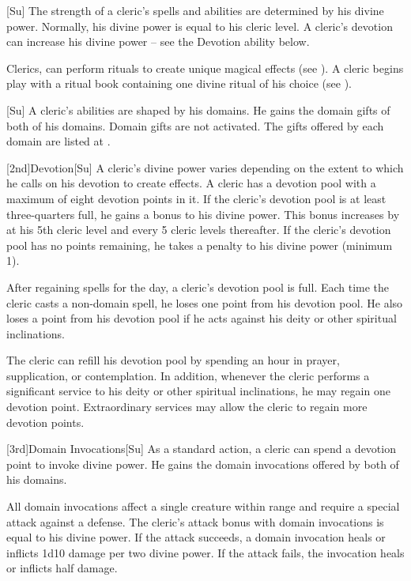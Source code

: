 [Su]
The strength of a cleric's spells and abilities are determined by his divine power.
Normally, his divine power is equal to his cleric level.
A cleric's devotion can increase his divine power -- see the Devotion ability below.

Clerics, can perform rituals to create unique magical effects (see ).
A cleric begins play with a ritual book containing one divine ritual of his choice (see ).

[Su]
A cleric's abilities are shaped by his domains.
He gains the domain gifts of both of his domains.
Domain gifts are not activated.
The gifts offered by each domain are listed at .

[2nd]{Devotion}[Su]
A cleric's divine power varies depending on the extent to which he calls on his devotion to create effects.
A cleric has a devotion pool with a maximum of eight devotion points in it.
If the cleric's devotion pool is at least three-quarters full, he gains a  bonus to his divine power.
This bonus increases by  at his 5th cleric level and every 5 cleric levels thereafter.
If the cleric's devotion pool has no points remaining, he takes a  penalty to his divine power (minimum 1).

After regaining spells for the day, a cleric's devotion pool is full.
Each time the cleric casts a non-domain spell, he loses one point from his devotion pool.
He also loses a point from his devotion pool if he acts against his deity or other spiritual inclinations.

The cleric can refill his devotion pool by spending an hour in prayer, supplication, or contemplation.
In addition, whenever the cleric performs a significant service to his deity or other spiritual inclinations, he may regain one devotion point.
Extraordinary services may allow the cleric to regain more devotion points.

[3rd]{Domain Invocations}[Su]
As a standard action, a cleric can spend a devotion point to invoke divine power.
He gains the domain invocations offered by both of his domains.

All domain invocations affect a single creature within \rngmed range and require a special attack against a defense.
The cleric's attack bonus with domain invocations is equal to his divine power.
If the attack succeeds, a domain invocation heals or inflicts 1d10 damage per two divine power.
If the attack fails, the invocation heals or inflicts half damage.

